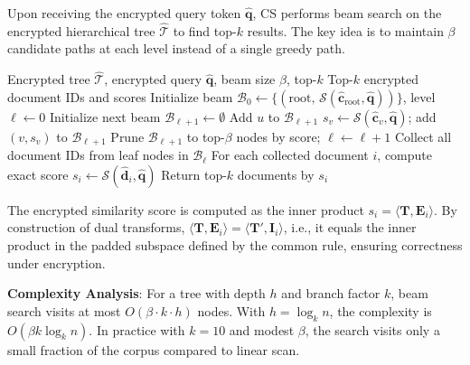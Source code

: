 \documentclass[journal]{IEEEtran}
\begin{document}
Upon receiving the encrypted query token $\widehat{\mathbf{q}}$, CS performs beam search on the encrypted hierarchical tree $\widehat{\mathcal{T}}$ to find top-$k$ results. The key idea is to maintain $\beta$ candidate paths at each level instead of a single greedy path.

\begin{algorithm}[t]
\caption{Beam Search on Encrypted Hierarchical Tree}
\label{alg:beam_search}
\begin{algorithmic}[1]
\REQUIRE Encrypted tree $\widehat{\mathcal{T}}$, encrypted query $\widehat{\mathbf{q}}$, beam size $\beta$, top-$k$
\ENSURE Top-$k$ encrypted document IDs and scores
\STATE Initialize beam $\mathcal{B}_0 \leftarrow \{(\text{root},\, \mathcal{S}(\widehat{\mathbf{c}}_{\text{root}},\widehat{\mathbf{q}}))\}$, level $\ell\leftarrow 0$
  \STATE Initialize next beam $\mathcal{B}_{\ell+1} \leftarrow \emptyset$
      \STATE Add $u$ to $\mathcal{B}_{\ell+1}$
    \ELSE
        \STATE $s_v \leftarrow \mathcal{S}(\widehat{\mathbf{c}}_v, \widehat{\mathbf{q}})$; add $(v,s_v)$ to $\mathcal{B}_{\ell+1}$
      \ENDFOR
    \ENDIF
  \ENDFOR
  \STATE Prune $\mathcal{B}_{\ell+1}$ to top-$\beta$ nodes by score; $\ell\leftarrow \ell{+}1$
\ENDWHILE
\STATE Collect all document IDs from leaf nodes in $\mathcal{B}_\ell$
\STATE For each collected document $i$, compute exact score $s_i \leftarrow \mathcal{S}(\widehat{\mathbf{d}}_i, \widehat{\mathbf{q}})$
\STATE Return top-$k$ documents by $s_i$
\end{algorithmic}
\end{algorithm}

The encrypted similarity score is computed as the inner product $s_i=\langle \mathbf{T}, \mathbf{E}_i\rangle$. By construction of dual transforms, $\langle \mathbf{T}, \mathbf{E}_i\rangle=\langle \mathbf{T}', \mathbf{I}_i\rangle$, i.e., it equals the inner product in the padded subspace defined by the common rule, ensuring correctness under encryption.

%
%
\textbf{Complexity Analysis}: For a tree with depth $h$ and branch factor $k$, beam search visits at most $O(\beta \cdot k \cdot h)$ nodes. With $h = \log_k n$, the complexity is $O(\beta k \log_k n)$. In practice with $k{=}10$ and modest $\beta$, the search visits only a small fraction of the corpus compared to linear scan.
\end{document}
